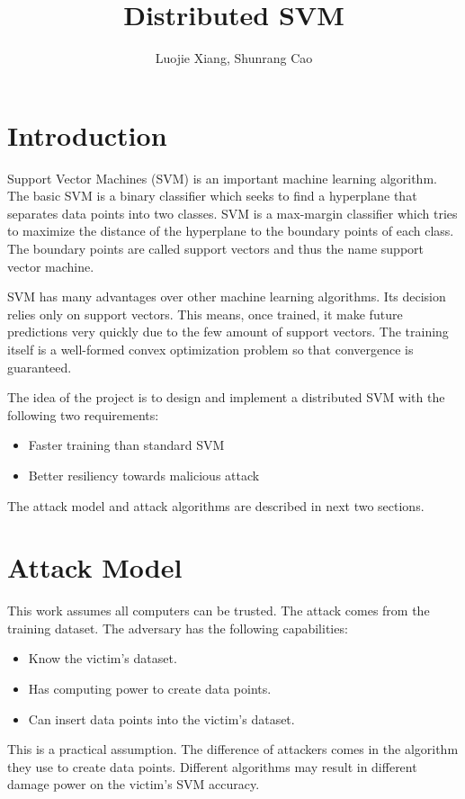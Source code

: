 \documentclass[10pt,conference,compsocconf,letterpaper]{IEEEtran}
\title{Distributed SVM}
\author{Luojie Xiang, Shunrang Cao}
\date{}
\begin{document}
\maketitle{}
\section{Introduction}

Support Vector Machines (SVM) is an important machine learning algorithm. The basic SVM is a binary classifier which seeks to find a hyperplane that separates data points into two classes. SVM is a max-margin classifier which tries to maximize the distance of the hyperplane to the boundary points of each class. The boundary points are called support vectors and thus the name support vector machine. 

SVM has many advantages over other machine learning algorithms. Its decision relies only on support vectors. This means, once trained, it make future predictions very quickly due to the few amount of support vectors. The training itself is a well-formed convex optimization problem so that convergence is guaranteed. 

The idea of the project is to design and implement a distributed SVM with the following two requirements:

\begin{itemize}
\item Faster training than standard SVM
\item Better resiliency towards malicious attack
\end{itemize}

The attack model and attack algorithms are described in next two sections.

\section{Attack Model}

This work assumes all computers can be trusted. The attack comes from the training dataset. The adversary has the following capabilities:

\begin{itemize}
\item Know the victim's dataset. 
\item Has computing power to create data points.
\item Can insert data points into the victim's dataset.
\end{itemize}

This is a practical assumption. The difference of attackers comes in the algorithm they use to create data points. Different algorithms may result in different damage power on the victim's SVM accuracy.
\end{document}
